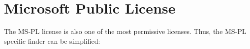 %
%
%
%
%



\section{Microsoft Public License}


The MS-PL license is also one of the most permissive licenses. Thus, the
MS-PL specific finder can be simplified:

